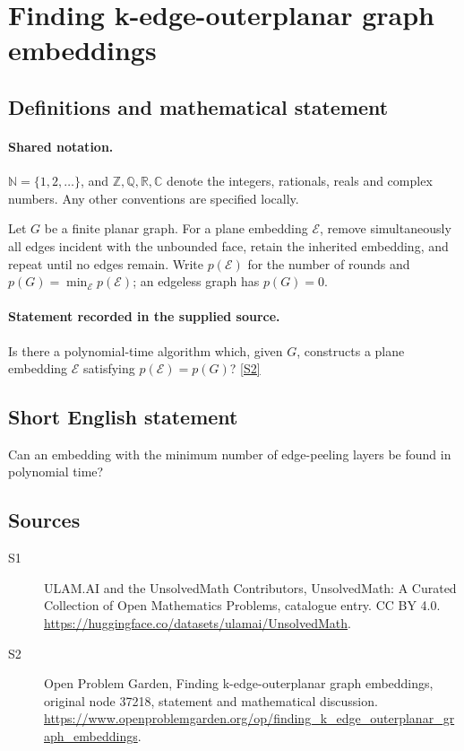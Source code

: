 \documentclass[11pt]{article}
\newcommand{\sref}[2]{\hyperlink{source:#1:#2}{[S#2]}}
\begin{document}
\section{Finding k-edge-outerplanar graph embeddings}\label{statement}

\subsection{Definitions and mathematical statement}

\paragraph{Shared notation.}$\mathbb N=\{1,2,\ldots\}$, and $\mathbb Z,\mathbb Q,\mathbb R,\mathbb C$ denote the integers, rationals, reals and complex numbers. Any other conventions are specified locally.


Let $G$ be a finite planar graph. For a plane embedding $\mathcal E$, remove simultaneously all edges incident with the unbounded face, retain the inherited embedding, and repeat until no edges remain. Write $p(\mathcal E)$ for the number of rounds and $p(G)=\min_{\mathcal E}p(\mathcal E)$; an edgeless graph has $p(G)=0$.
\paragraph{Statement recorded in the supplied source.}
Is there a polynomial-time algorithm which, given $G$, constructs a plane embedding $\mathcal E$ satisfying $p(\mathcal E)=p(G)$? \sref{statement}{2}
\subsection{Short English statement}
Can an embedding with the minimum number of edge-peeling layers be found in polynomial time?
\subsection{Sources}
\begin{description}
\item[\hypertarget{source:statement:1}{S1}] ULAM.AI and the UnsolvedMath Contributors, UnsolvedMath: A Curated Collection of Open Mathematics Problems, catalogue entry. CC BY 4.0. \url{https://huggingface.co/datasets/ulamai/UnsolvedMath}.
\item[\hypertarget{source:statement:2}{S2}] Open Problem Garden, Finding k-edge-outerplanar graph embeddings, original node 37218, statement and mathematical discussion. \url{https://www.openproblemgarden.org/op/finding_k_edge_outerplanar_graph_embeddings}.
\end{description}
\label{end:statement}
\end{document}
